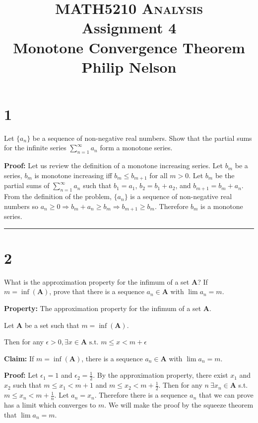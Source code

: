 \documentclass[10pt,letterpaper]{article}
\newcommand\A{\mathbf{A}}
\newcommand\ds{\displaystyle}
\newcommand\qedsym{\hfill \rule{2mm}{2mm}}
\begin{document}
\title{MATH5210 \textsc{Analysis}
  \\ Assignment 4
  \\ Monotone Convergence Theorem
  \\ Philip Nelson
}

\date{}

\maketitle

\section*{1} Let $\{a_n\}$ be a sequence of non-negative real numbers. Show that the partial sums for the infinite series $\ds \sum_{n=1}^{\infty } a_n$ form a monotone series.

\textbf{Proof:} Let us review the definition of a monotone increasing series. Let $b_m$ be a series, $b_m$ is monotone increasing iff $b_m \leq b_{m+1}$ for all $m > 0$. Let $b_m$ be the partial sums of $\ds \sum_{n=1}^{\infty } a_n$ such that $b_1 = a_1$, $b_2 = b_1 + a_2$, and $b_{m+1} = b_m + a_n$. From the definition of the problem, $\{a_n\}$ is a sequence of non-negative real numbers so $a_n \geq 0 \Rightarrow b_m + a_n \geq b_m \Rightarrow b_{m+1} \geq b_m$. Therefore $b_m$ is a monotone series. \qedsym{}
\section*{2} What is the approximation property for the infimum of a set $\A$? If $m = \inf(\A)$, prove that there is a sequence $a_n \in \A$ with $\lim a_n = m$.

\medskip

\textbf{Property:} The approximation property for the infimum of a set $\A$.

Let $\A$ be a set such that $m = \inf(\A)$.

Then for any $\epsilon > 0, \exists x \in \A \text{ s.t. }  m \leq x < m + \epsilon$

\medskip

\textbf{Claim:} If $m = \inf(\A)$, there is a sequence $a_n \in \A$ with $\lim a_n = m$.

\medskip

\textbf{Proof:} Let $\epsilon_1 = 1$ and $\epsilon_2 = \frac{1}{2}$. By the approximation property, there exist $x_1$ and $x_2$ such that $m \leq x_1 < m + 1$ and $m \leq x_2 < m + \frac{1}{2}$. Then for any $n\ \exists x_n \in \A$ s.t. $m \leq x_n < m + \frac{1}{n}$. Let $a_n = x_n$. Therefore there is a sequence $a_n$ that we can prove has a limit which converges to $m$. We will make the proof by the squeeze theorem that $\lim a_n = m$.
\end{document}
